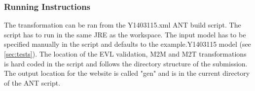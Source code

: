 \documentclass[11pt,a4paper]{article}
\begin{document}
	\subsubsection{Running Instructions}
	The transformation can be ran from the Y1403115.xml ANT build script. The script has to run in the same JRE as the workspace. The input model has to be specified manually in the script and defaults to the example.Y1403115 model (see \autoref{sec:tests}). The location of the EVL validation, M2M and M2T transformations is hard coded in the script and follows the directory structure of the submission. The output location for the website is called "gen" and is in the current directory of the ANT script. 
	
\printbibliography
\end{document}
